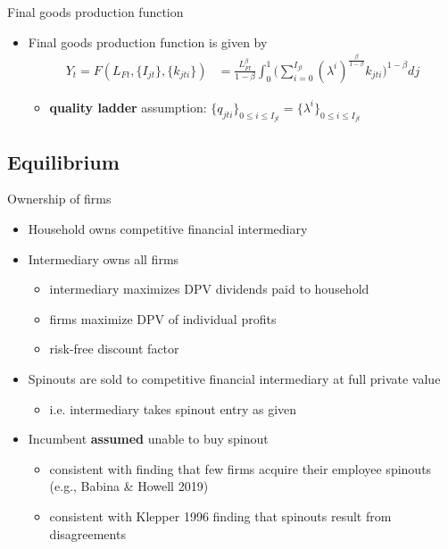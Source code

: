 \documentclass[english,usenames,dvipsnames]{beamer}
\begin{document}
\begin{frame}{Final goods production function}\label{definition:final_goods_production}\hyperlink{main:final_goods_production}{}
	\begin{itemize}
		\item Final goods production function is given by
		\begin{align*}
		Y_t = F(L_{Ft},\{I_{jt}\},\{k_{jti}\}) &= \frac{L_{Ft}^{\beta}}{1-\beta} \int_0^1 \Big(\sum_{i = 0}^{I_{jt}} (\lambda^{i})^{\frac{\beta}{1-\beta}} k_{jti} \Big)^{1-\beta} dj
		\end{align*}
		\begin{itemize}
			\item \alert{\textbf{quality ladder}} assumption: $\{q_{jti}\}_{0 \le i \le I_{jt}} = \{\lambda^i\}_{0 \le i \le I_{jt}}$
		\end{itemize}
	\end{itemize}
\end{frame}


\subsection{Equilibrium}

\begin{frame}{Ownership of firms}\label{model:firm_ownership}
	\hyperlink{definition:equilibrium}{}
	\begin{itemize}
		\item Household owns competitive financial intermediary
		\item Intermediary owns all firms
		\begin{itemize}
			\item intermediary maximizes DPV dividends paid to household
			\item firms maximize DPV of individual profits
			\item risk-free discount factor
		\end{itemize}
		\medskip
		\item Spinouts are sold to competitive financial intermediary at full private value
		\begin{itemize}
			\item i.e. intermediary takes spinout entry as given
		\end{itemize}
		\medskip
		\item Incumbent \alert{\textbf{assumed}} unable to buy spinout 
		\begin{itemize}
			\item consistent with finding that few firms acquire their employee spinouts (e.g., Babina \& Howell 2019)
			\item consistent with Klepper 1996 finding that spinouts result from disagreements
		\end{itemize}
	\end{itemize}
\end{frame}
\end{document}
